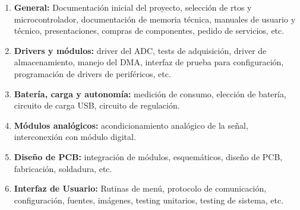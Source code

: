 \begin{enumerate}

\item \textbf{General:} Documentación inicial del proyecto, selección de rtos y microcontrolador, documentación de memoria técnica, manuales de usuario y técnico, presentaciones, compras de componentes, pedido de servicios, etc.

\item \textbf{Drivers y módulos:} driver del ADC, tests de adquisición, driver de almacenamiento, manejo del DMA, interfaz de prueba para configuración, programación de drivers de periféricos, etc.

\item \textbf{Batería, carga y autonomía:} medición de consumo, elección de batería, circuito de carga USB, circuito de regulación.

\item \textbf{Módulos analógicos:} acondicionamiento analógico de la señal, interconexión con módulo digital.

\item \textbf{Diseño de PCB:} integración de módulos, esquemáticos, diseño de PCB, fabricación, soldadura, etc.

\item \textbf{Interfaz de Usuario:} Rutinas de menú, protocolo de comunicación, configuración, fuentes, imágenes, testing unitarios, testing de sistema, etc.

\end{enumerate}
